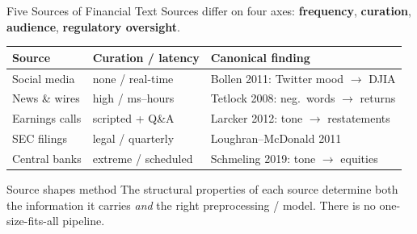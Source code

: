 \documentclass[9pt,t]{beamer}
\begin{document}
\begin{frame}{Five Sources of Financial Text}
Sources differ on four axes: \textbf{frequency}, \textbf{curation},
\textbf{audience}, \textbf{regulatory oversight}.

\medskip
\small
\begin{tabular}{lll}
\toprule
\textbf{Source} & \textbf{Curation / latency} & \textbf{Canonical finding} \\
\midrule
Social media        & none / real-time   & Bollen 2011: Twitter mood $\to$ DJIA \\
News \& wires        & high / ms--hours   & Tetlock 2008: neg.\ words $\to$ returns \\
Earnings calls      & scripted + Q\&A    & Larcker 2012: tone $\to$ restatements \\
SEC filings         & legal / quarterly  & Loughran--McDonald 2011 \\
Central banks       & extreme / scheduled& Schmeling 2019: tone $\to$ equities \\
\bottomrule
\end{tabular}

\normalsize
\medskip
\begin{alertblock}{Source shapes method}
The structural properties of each source determine both the information it
carries \emph{and} the right preprocessing / model. There is no
one-size-fits-all pipeline.
\end{alertblock}
\end{frame}
\end{document}

